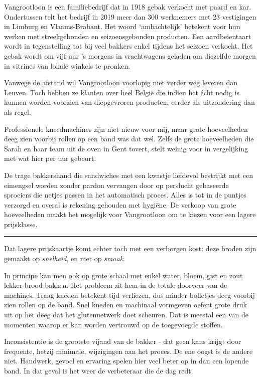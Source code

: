 \documentclass[
  11pt,
  dutch,
]{memoir}
\begin{document}
Vangrootloon is een familiebedrijf dat in 1918 gebak verkocht met paard
en kar. Ondertussen telt het bedrijf in 2019 meer dan 300 werknemers met
23 vestigingen in Limburg en Vlaams-Brabant. Het woord `ambachtelijk'
betekent voor hun werken met streekgebonden en seizoensgebonden
producten. Een aardbeientaart wordt in tegenstelling tot bij veel
bakkers enkel tijdens het seizoen verkocht. Het gebak wordt om vijf uur
's morgens in vrachtwagens geladen om diezelfde morgen in vitrines van
lokale winkels te pronken.

Vanwege de afstand wil Vangrootloon voorlopig niet verder weg leveren
dan Leuven. Toch hebben ze klanten over heel België die indien het écht
nodig is kunnen worden voorzien van diepgevroren producten, eerder als
uitzondering dan als regel.

Professionele kneedmachines zijn niet nieuw voor mij, maar grote
hoeveelheden deeg zien voorbij rollen op een band was dat wel. Zelfs de
grote hoeveelheden die Sarah en haar team uit de oven in Gent tovert,
stelt weinig voor in vergelijking met wat hier per uur gebeurt.

De trage bakkershand die sandwiches met een kwastje liefdevol bestrijkt
met een eimengsel worden zonder pardon vervangen door op perslucht
gebaseerde sproeiers die netjes passen in het automatisch proces. Alles
is tot in de puntjes verzorgd en overal is rekening gehouden met
hygiëne. De verkoop van grote hoeveelheden maakt het mogelijk voor
Vangrootloon om te kiezen voor een lagere prijsklasse.

\pfbreak

Dat lagere prijskaartje komt echter toch met een verborgen kost: deze
broden zijn gemaakt op \emph{snelheid}, en niet op \emph{smaak}.

In principe kan men ook op grote schaal met enkel water, bloem, gist en
zout lekker brood bakken. Het probleem zit hem in de totale doorvoer van
de machines. Traag kneden betekent tijd verliezen, dus minder bolletjes
deeg voorbij zien rollen op de band. Snel kneden en machinaal vormgeven
oefent grote druk uit op het deeg dat het glutennetwerk doet scheuren.
Dat is meestal een van de momenten waarop er kan worden vertrouwd op de
toegevoegde stoffen.

Inconsistentie is de grootste vijand van de bakker - dat geen kans
krijgt door frequente, hetzij minimale, wijzigingen aan het proces. De
ene oogst is de andere niet. Handwerk, gevoel en ervaring spelen hier
veel beter op in dan een lopende band. In dat geval is het weer de
verbeteraar die de dag redt.
\end{document}

